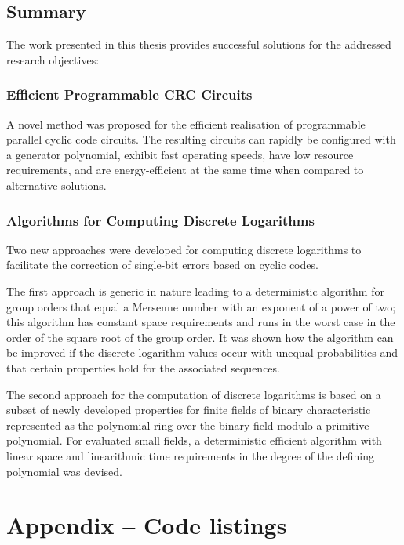 \documentclass[a4paper, 11pt]{article}
\begin{document}
\subsection{Summary}
The work presented in this thesis provides successful solutions for the addressed research objectives:

\subsubsection{Efficient Programmable CRC Circuits}

A novel method was proposed for the efficient realisation of programmable parallel cyclic code circuits. The resulting circuits can rapidly be configured with a generator polynomial, exhibit fast operating speeds, have low resource requirements, and are energy-efficient at the same time when compared to alternative solutions.

\subsubsection{Algorithms for Computing Discrete Logarithms}

Two new approaches were developed for computing discrete logarithms to facilitate the correction of single-bit errors based on cyclic codes.

The first approach is generic in nature leading to a deterministic algorithm for group orders that equal a Mersenne number with an exponent of a power of two; this algorithm has constant space requirements and runs in the worst case in the order of the square root of the group order. It was shown how the algorithm can be improved if the discrete logarithm values occur with unequal probabilities and that certain properties hold for the associated sequences.

The second approach for the computation of discrete logarithms is based on a subset of newly developed properties for finite fields of binary characteristic represented as the polynomial ring over the binary field modulo a primitive polynomial. For evaluated small fields, a deterministic efficient algorithm with linear space and linearithmic time requirements in the degree of the defining polynomial was devised.

\newpage
\section*{Appendix -- Code listings}
\begin{multicols}{2}
\inputminted[fontsize=\tiny]{c}{code/dumpBounce.c}
\end{multicols}

\begin{multicols}{2}
\inputminted[fontsize=\tiny]{python}{code/backpressure.py}
\end{multicols}

\begin{multicols}{2}
\inputminted[fontsize=\tiny]{python}{code/bursting.py}
\end{multicols}
\end{document}
